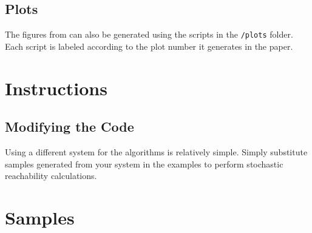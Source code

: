 \documentclass[11pt]{article}
\begin{document}
\subsection{Plots}

The figures from \cite{thorpe2019stochastic} can also be generated using the scripts in the \verb|/plots| folder. Each script is labeled according to the plot number it generates in the paper.


\section{Instructions}
\label{section: instructions}


\subsection{Modifying the Code}

Using a different system for the algorithms is relatively simple. Simply substitute samples generated from your system in the examples to perform stochastic reachability calculations.


\section{Samples}
\label{section: samples}
\end{document}

